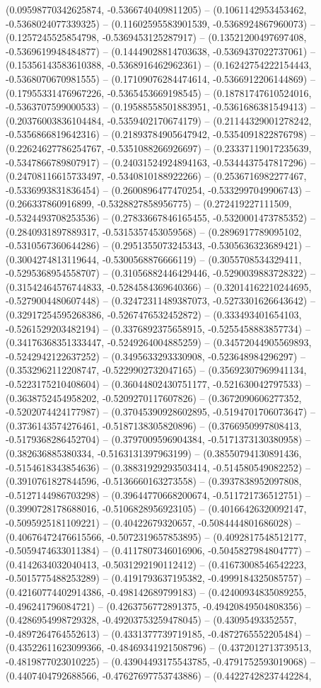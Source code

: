 (0.09598770342625874, -0.5366740409811205) -- (0.1061142953453462, -0.5368024077339325) -- (0.11602595583901539, -0.5368924867960073) -- (0.1257245525854798, -0.5369453125287917) -- (0.13521200497697408, -0.5369619948484877) -- (0.14449028814703638, -0.5369437022737061) -- (0.15356143583610388, -0.5368916462962361) -- (0.16242754222154443, -0.5368070670981555) -- (0.17109076284474614, -0.5366912206144869) -- (0.17955331476967226, -0.5365453669198545) -- (0.18781747610524016, -0.5363707599000533) -- (0.19588558501883951, -0.5361686381549413) -- (0.20376003836104484, -0.5359402170674179) -- (0.21144329001278242, -0.5356866819642316) -- (0.21893784905647942, -0.5354091822876798) -- (0.22624627786254767, -0.5351088266926697) -- (0.23337119017235639, -0.5347866789807917) -- (0.24031524924894163, -0.5344437547817296) -- (0.24708116615733497, -0.5340810188922266) -- (0.2536716982277467, -0.5336993831836454) -- (0.2600896477470254, -0.5332997049906743) -- (0.266337860916899, -0.5328827858956775) -- (0.272419227111509, -0.5324493708253536) -- (0.27833667846165455, -0.5320001473785352) -- (0.2840931897889317, -0.5315357453059568) -- (0.2896917789095102, -0.5310567360644286) -- (0.2951355073245343, -0.5305636323689421) -- (0.3004274813119644, -0.5300568876666119) -- (0.3055708534329411, -0.5295368954558707) -- (0.31056882446429446, -0.5290039883728322) -- (0.31542464576744833, -0.5284584369640366) -- (0.32014162210244695, -0.5279004480607448) -- (0.32472311489387073, -0.5273301626643642) -- (0.32917254595268386, -0.5267476532452872) -- (0.333493401654103, -0.5261529203482194) -- (0.3376892375658915, -0.5255458883857734) -- (0.34176368351333447, -0.5249264004885259) -- (0.34572044905569893, -0.5242942122637252) -- (0.3495633293330908, -0.523648984296297) -- (0.3532962112208747, -0.5229902732047165) -- (0.35692307969941134, -0.5223175210408604) -- (0.36044802430751177, -0.521630042797533) -- (0.3638752454958202, -0.5209270117607826) -- (0.3672090606277352, -0.5202074424177987) -- (0.37045390928602895, -0.5194701706073647) -- (0.3736143574276461, -0.5187138305820896) -- (0.3766950997808413, -0.5179368286452704) -- (0.3797009596904384, -0.5171373130380958) -- (0.382636885380334, -0.5163131397963199) -- (0.38550794130891436, -0.5154618343854636) -- (0.38831929293503414, -0.514580549082252) -- (0.3910761827844596, -0.5136660163273558) -- (0.3937838952097808, -0.5127144986703298) -- (0.39644770668200674, -0.511721736512751) -- (0.3990728178688016, -0.5106828956923105) -- (0.40166426320092147, -0.5095925181109221) -- (0.40422679320657, -0.5084444801686028) -- (0.40676472476615566, -0.5072319657853895) -- (0.4092817548512177, -0.5059474633011384) -- (0.4117807346016906, -0.5045827984804777) -- (0.4142634032040413, -0.5031292190112412) -- (0.41673008546542223, -0.5015775488253289) -- (0.4191793637195382, -0.4999184325085757) -- (0.42160774402914386, -0.498142689799183) -- (0.42400934835089255, -0.496241796084721) -- (0.4263756772891375, -0.49420849504808356) -- (0.4286954998729328, -0.49203753259478045) -- (0.43095493352557, -0.4897264764552613) -- (0.4331377739719185, -0.4872765552205484) -- (0.43522611623099366, -0.48469341921508796) -- (0.4372012713739513, -0.4819877023010225) -- (0.43904493175543785, -0.4791752593019068) -- (0.4407404792688566, -0.47627697753743886) -- (0.44227428237442284, 
